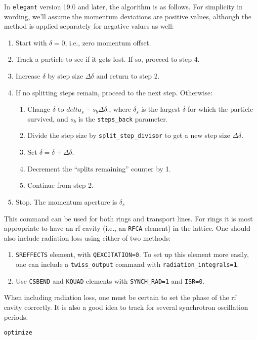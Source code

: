 \documentclass[11pt]{article}
\begin{document}
In {\tt elegant} version 19.0 and later, the algorithm is as follows.  For simplicity in
wording, we'll assume the momentum deviations are positive values,
although the method is applied separately for negative values as well:
\begin{enumerate}
\item Start with $\delta=0$, i.e., zero momentum offset.
\item Track a particle to see if it gets lost.  If so, proceed to step 4.
\item Increase $\delta$ by step size $\Delta\delta$ and return to step 2.
\item If no splitting steps remain, proceed to the next step.  Otherwise:
\begin{enumerate}
\item Change $\delta$ to $delta_s - s_b\Delta\delta$., where $\delta_s$ is
 the largest $\delta$ for which the particle survived, and $s_b$ is the
 \verb|steps_back| parameter.
\item Divide the step size by \verb|split_step_divisor| to get a new step size  $\Delta\delta$.
\item Set $\delta = \delta + \Delta\delta$.
\item Decrement the ``splits remaining'' counter by 1.
\item Continue from step 2.
\end{enumerate}
\item Stop.  The momentum aperture is $\delta_s$
\end{enumerate}

This command can be used for both rings and transport lines.  For
rings it is most appropriate to have an rf cavity (i.e., an {\tt RFCA}
element) in the lattice.  One should also include radiation loss using
either of two methods:
\begin{enumerate}
\item {\tt SREFFECTS} element, with {\tt QEXCITATION=0}.  To set up this element more easily, one
 can include a \verb|twiss_output| command with \verb|radiation_integrals=1|.
\item Use {\tt CSBEND} and {\tt KQUAD} elements with \verb|SYNCH_RAD=1| and \verb|ISR=0|.
\end{enumerate}
When including radiation loss, one must be certain to set the phase of the rf cavity
correctly.  It is also a good idea to track for several synchrotron oscillation periods.

\begin{latexonly}
\newpage
\begin{center}{\Large\verb|optimize|}\end{center}
\end{latexonly}
\end{document}
